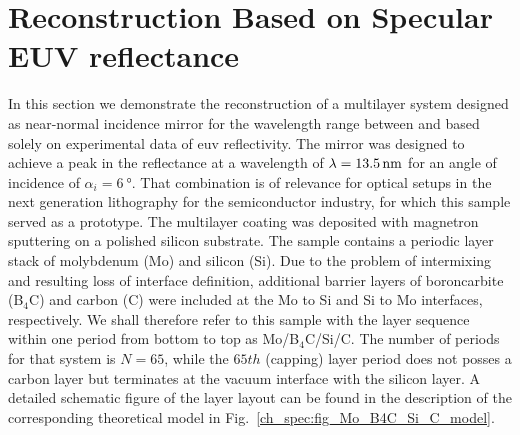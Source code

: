 \section{Reconstruction Based on Specular EUV reflectance} \label{ch_spec:sec_PTB17}

In this section we demonstrate the reconstruction of a multilayer system designed as near-normal incidence mirror for the wavelength range between  and  based solely on experimental data of \gls{euv} reflectivity. The mirror was designed to achieve a peak in the reflectance at a wavelength of $\lambda=\nm{13.5}$ for an angle of incidence of $\alpha_i = \SI{6}{\degree}$. That combination is of relevance for optical setups in the next generation lithography for the semiconductor industry, for which this sample served as a prototype. The multilayer coating was deposited with magnetron sputtering on a polished silicon substrate. The sample contains a periodic layer stack of molybdenum (Mo) and silicon (Si). Due to the problem of intermixing and resulting loss of interface definition, additional barrier layers of boroncarbite (B$_4$C) and carbon (C) were included at the Mo to Si and Si to Mo interfaces, respectively. We shall therefore refer to this sample with the layer sequence within one period from bottom to top as Mo/B$_4$C/Si/C. The number of periods for that system is $N=65$, while the $65th$ (capping) layer period does not posses a carbon layer but terminates at the vacuum interface with the silicon layer. A detailed schematic figure of the layer layout can be found in the description of the corresponding theoretical model in Fig.~\ref{ch_spec:fig_Mo_B4C_Si_C_model}.

